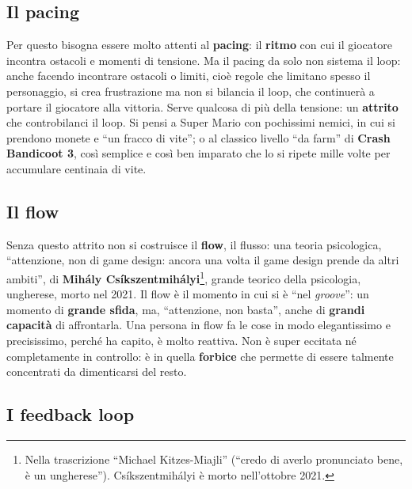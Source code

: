 \subsection{Il pacing}

Per questo bisogna essere molto attenti al \textbf{pacing}: il \textbf{ritmo} con
cui il giocatore incontra ostacoli e momenti di tensione. Ma il pacing da solo
non sistema il loop: anche facendo incontrare ostacoli o limiti, cioè regole che
limitano spesso il personaggio, si crea frustrazione ma non si bilancia il loop,
che continuerà a portare il giocatore alla vittoria. Serve qualcosa di più della
tensione: un \textbf{attrito} che controbilanci il loop. Si pensi a Super Mario
con pochissimi nemici, in cui si prendono monete e ``un fracco di vite''; o al
classico livello ``da farm'' di \textbf{Crash Bandicoot 3}, così semplice e così
ben imparato che lo si ripete mille volte per accumulare centinaia di vite.

\subsection{Il flow}

Senza questo attrito non si costruisce il \textbf{flow}, il flusso: una teoria
psicologica, ``attenzione, non di game design: ancora una volta il game design
prende da altri ambiti'', di \textbf{Mihály Csíkszentmihályi}\footnote{Nella
trascrizione ``Michael Kitzes-Miajli'' (``credo di averlo pronunciato bene, è un
ungherese''). Csíkszentmihályi è morto nell'ottobre 2021.}, grande teorico della
psicologia, ungherese, morto nel 2021. Il flow è il momento in cui si è ``nel
\emph{groove}'': un momento di \textbf{grande sfida}, ma, ``attenzione, non
basta'', anche di \textbf{grandi capacità} di affrontarla. Una persona in flow fa
le cose in modo elegantissimo e precisissimo, perché ha capito, è molto
reattiva. Non è super eccitata né completamente in controllo: è in quella
\textbf{forbice} che permette di essere talmente concentrati da dimenticarsi del
resto.

\subsection{I feedback loop}

